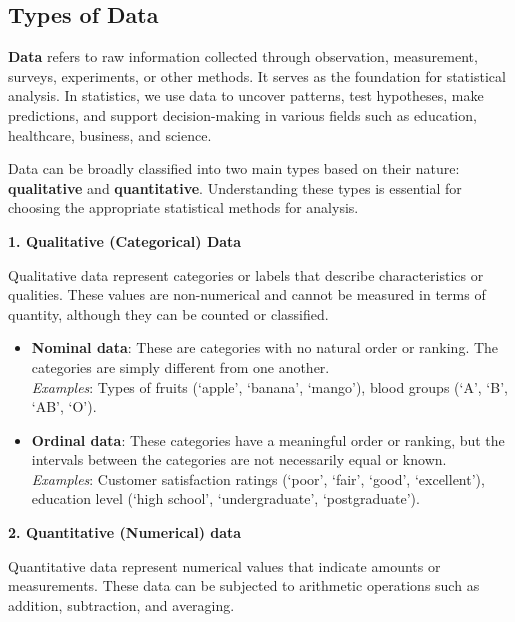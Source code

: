 \documentclass[twoside]{book}
\begin{document}
\subsection{Types of Data}

\textbf{Data} refers to raw information collected through observation, measurement, surveys, experiments, or other methods. It serves as the foundation for statistical analysis. In statistics, we use data to uncover patterns, test hypotheses, make predictions, and support decision-making in various fields such as education, healthcare, business, and science.

Data can be broadly classified into two main types based on their nature: \textbf{qualitative} and \textbf{quantitative}. Understanding these types is essential for choosing the appropriate statistical methods for analysis.

\bigskip

\textbf{1. Qualitative (Categorical) Data}

Qualitative data represent categories or labels that describe characteristics or qualities. These values are non-numerical and cannot be measured in terms of quantity, although they can be counted or classified.

\begin{itemize}
    \item \textbf{Nominal data}: These are categories with no natural order or ranking. The categories are simply different from one another.\\
    \textit{Examples}: Types of fruits (`apple', `banana', `mango'), blood groups (`A', `B', `AB', `O').

    \item \textbf{Ordinal data}: These categories have a meaningful order or ranking, but the intervals between the categories are not necessarily equal or known.\\
    \textit{Examples}: Customer satisfaction ratings (`poor', `fair', `good', `excellent'), education level (`high school', `undergraduate', `postgraduate').
\end{itemize}

\bigskip

\textbf{2. Quantitative (Numerical) data}

Quantitative data represent numerical values that indicate amounts or measurements. These data can be subjected to arithmetic operations such as addition, subtraction, and averaging.
\end{document}
